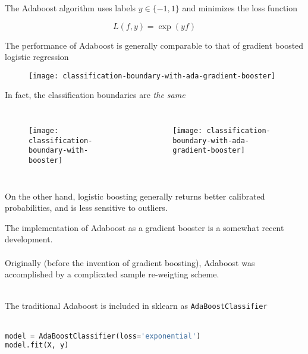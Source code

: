 %
\begin{frame}
The Adaboost algorithm uses labels $y \in \{-1, 1\}$ and minimizes the loss function

$$ L(f, y) = \exp(y f) $$

\end{frame}
%
\begin{frame}
The performance of Adaboost is generally comparable to that of gradient boosted logistic regression

  \begin{figure}
  
    \texttt{[image: classification-boundary-with-ada-gradient-booster]}
  \end{figure}
  
\end{frame}
%
\begin{frame}
In fact, the classification boundaries are \textit{the same}

  \begin{columns}
    \begin{figure}
      \texttt{[image: classification-boundary-with-booster]}
    \end{figure}
    \begin{figure}
      \texttt{[image: classification-boundary-with-ada-gradient-booster]}
    \end{figure}
  \end{columns}
  
On the other hand, logistic boosting generally returns better calibrated probabilities, and is less sensitive to outliers.
  
\end{frame}
%
\begin{frame}[fragile]
The implementation of Adaboost as a gradient booster is a somewhat recent development.\\~\\

Originally (before the invention of gradient boosting), Adaboost was accomplished by a complicated sample re-weigting scheme.\\~\\
\end{frame}
%
\begin{frame}[fragile]
The traditional Adaboost is included in sklearn as \texttt{AdaBoostClassifier}\\~\\

\begin{lstlisting}[language=python]
model = AdaBoostClassifier(loss='exponential')
model.fit(X, y)
\end{lstlisting}
\end{frame}
